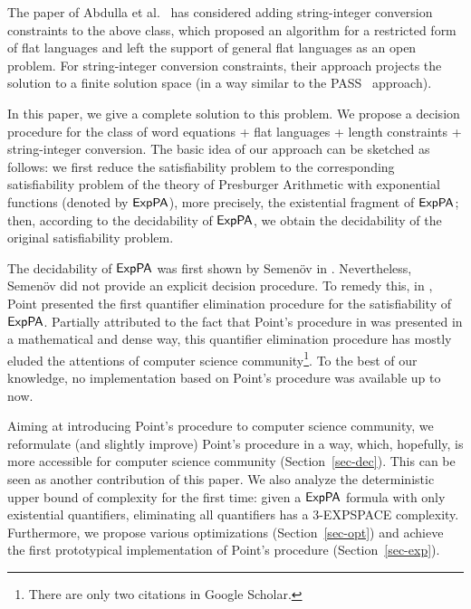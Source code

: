The paper of Abdulla et al.~\cite{Parosh:20:PLDI} has considered adding string-integer conversion constraints to the above class,
which proposed an algorithm for a restricted form of flat languages and left the support of general flat languages as an open problem.
For string-integer conversion constraints, their approach projects the solution to 
a finite solution space (in a way similar to the PASS~\cite{goudong2013pass} approach).

In this paper, we give a complete solution to this problem.
We propose a decision procedure for the class of word equations + flat languages + length constraints + string-integer conversion.
The basic idea of our approach can be sketched as follows: we first reduce the satisfiability problem to the corresponding satisfiability problem of the theory of Presburger Arithmetic with exponential functions (denoted by ${\sf ExpPA}$), more precisely, the existential fragment of ${\sf ExpPA}$; then, according to the decidability of ${\sf ExpPA}$, we obtain the decidability of the original satisfiability problem.  

The decidability of ${\sf ExpPA}$ was first shown by Semen\"{o}v in \cite{Semenov84}. Nevertheless, Semen\"{o}v did not provide an explicit decision procedure. To remedy this, in \cite{Point86}, Point presented the first quantifier elimination procedure for the satisfiability of ${\sf ExpPA}$. Partially attributed to the fact that Point's procedure in \cite{Point86} was presented  in a mathematical and dense way, this quantifier elimination procedure has mostly eluded the attentions of computer science community\footnote{There are only two citations in Google Scholar.}.  To the best of our knowledge, no implementation based on Point's procedure was available up to now. 

Aiming at introducing Point's procedure to computer science community, we reformulate (and slightly improve) Point's procedure in a way, which, hopefully, is more accessible for computer science community (Section~\ref{sec-dec}). This can be seen as another contribution of this paper.
We also analyze the deterministic upper bound of complexity for the first time: given a ${\sf ExpPA}$ formula with only existential quantifiers, eliminating all quantifiers has a 3-EXPSPACE complexity. Furthermore, we propose various optimizations (Section~\ref{sec-opt}) and achieve the first prototypical implementation of Point's procedure (Section~\ref{sec-exp}).

